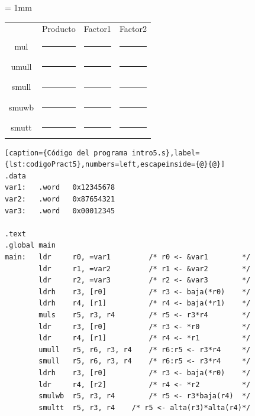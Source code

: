 \begin{center}
\small
\colorbox[gray]{0.9}{
\tabcolsep = 1mm
\begin{tabular}{cccc}
& Producto & Factor1 & Factor2 \\
mul & 
\colorbox[gray]{1}{\rule{4cm}{0cm}\rule{0cm}{0.46cm}} &
\colorbox[gray]{1}{\rule{2cm}{0cm}\rule{0cm}{0.46cm}} &
\colorbox[gray]{1}{\rule{2cm}{0cm}\rule{0cm}{0.46cm}} \\
umull & 
\colorbox[gray]{1}{\rule{4cm}{0cm}\rule{0cm}{0.46cm}} &
\colorbox[gray]{1}{\rule{2cm}{0cm}\rule{0cm}{0.46cm}} &
\colorbox[gray]{1}{\rule{2cm}{0cm}\rule{0cm}{0.46cm}} \\
smull & 
\colorbox[gray]{1}{\rule{4cm}{0cm}\rule{0cm}{0.46cm}} &
\colorbox[gray]{1}{\rule{2cm}{0cm}\rule{0cm}{0.46cm}} &
\colorbox[gray]{1}{\rule{2cm}{0cm}\rule{0cm}{0.46cm}} \\
smuwb & 
\colorbox[gray]{1}{\rule{4cm}{0cm}\rule{0cm}{0.46cm}} &
\colorbox[gray]{1}{\rule{2cm}{0cm}\rule{0cm}{0.46cm}} &
\colorbox[gray]{1}{\rule{2cm}{0cm}\rule{0cm}{0.46cm}} \\
smutt & 
\colorbox[gray]{1}{\rule{4cm}{0cm}\rule{0cm}{0.46cm}} &
\colorbox[gray]{1}{\rule{2cm}{0cm}\rule{0cm}{0.46cm}} &
\colorbox[gray]{1}{\rule{2cm}{0cm}\rule{0cm}{0.46cm}} \\
\end{tabular}
}
\end{center}

\begin{lstlisting}[caption={Código del programa intro5.s},label={lst:codigoPract5},numbers=left,escapeinside={@}{@}]
.data
var1:   .word   0x12345678
var2:   .word   0x87654321
var3:   .word   0x00012345

.text
.global main
main:   ldr     r0, =var1         /* r0 <- &var1        */
        ldr     r1, =var2         /* r1 <- &var2        */
        ldr     r2, =var3         /* r2 <- &var3        */
        ldrh    r3, [r0]          /* r3 <- baja(*r0)    */
        ldrh    r4, [r1]          /* r4 <- baja(*r1)    */
        muls    r5, r3, r4        /* r5 <- r3*r4        */
        ldr     r3, [r0]          /* r3 <- *r0          */
        ldr     r4, [r1]          /* r4 <- *r1          */
        umull   r5, r6, r3, r4    /* r6:r5 <- r3*r4     */
        smull   r5, r6, r3, r4    /* r6:r5 <- r3*r4     */
        ldrh    r3, [r0]          /* r3 <- baja(*r0)    */
        ldr     r4, [r2]          /* r4 <- *r2          */
        smulwb  r5, r3, r4        /* r5 <- r3*baja(r4)  */
        smultt  r5, r3, r4    /* r5 <- alta(r3)*alta(r4)*/
\end{lstlisting}



\chapterend{}
